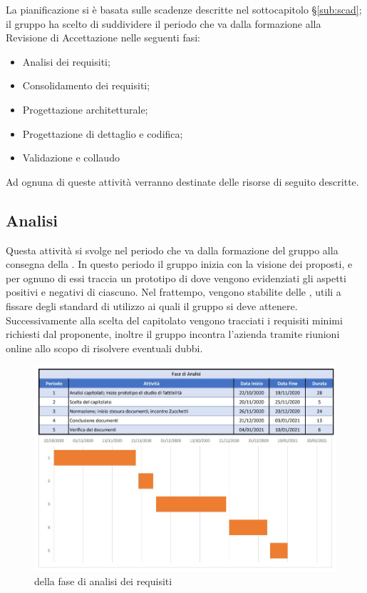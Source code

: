 \documentclass[../piano_di_progetto.tex]{subfiles}
\begin{document}
La pianificazione si è basata sulle scadenze descritte nel sottocapitolo \S\ref{sub:scad}; il gruppo ha scelto di suddividere il periodo che va dalla formazione alla Revisione di Accettazione nelle seguenti fasi:
\begin{itemize}
\item Analisi dei requisiti;
\item Consolidamento dei requisiti;
\item Progettazione architetturale;
\item Progettazione di dettaglio e codifica;
\item Validazione e collaudo
\end{itemize}
Ad ognuna di queste attività verranno destinate delle risorse di seguito descritte.


\subsection{Analisi}%
\label{sub:analisi}
Questa attività si svolge nel periodo che va dalla formazione del gruppo alla consegna della . In questo periodo il gruppo inizia con la visione dei  proposti, e per ognuno di essi traccia un prototipo di \textsc{} dove vengono evidenziati gli aspetti positivi e negativi di ciascuno. Nel frattempo, vengono stabilite delle , utili a fissare degli standard di utilizzo ai quali il gruppo si deve attenere. Successivamente alla scelta del capitolato vengono tracciati i requisiti minimi richiesti dal proponente, inoltre il gruppo incontra l’azienda tramite riunioni online allo scopo di risolvere eventuali dubbi.\\

\begin{figure}[H]
\centering

\includegraphics[width=12cm]{componenti/img/fase_analisi}
\caption{  della fase di analisi dei requisiti}

\end{figure}
\end{document}
